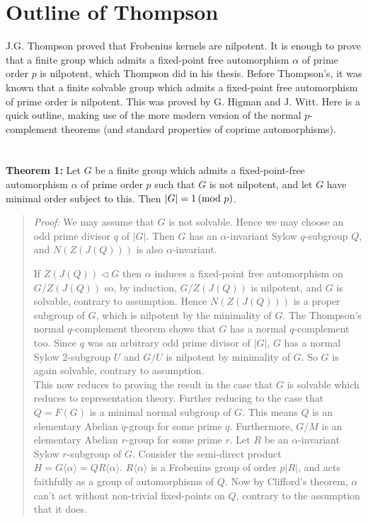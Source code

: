 \section{Outline of Thompson}
J.G. Thompson proved that Frobenius kernels are nilpotent.
It is enough to prove that a finite group which admits a fixed-point free automorphism $\alpha$
of prime order $p$ is nilpotent, which Thompson did in his thesis.
Before Thompson's, it was known that a finite solvable group which admits a fixed-point free automorphism of prime order is nilpotent. This was proved by G. Higman and J. Witt.
Here is a quick outline, making use of the more modern version of the normal $p$-complement theorems
(and standard properties of coprime automorphisms).\\
\\
\\
{\bf Theorem 1:}  Let $G$ be a finite group which admits a fixed-point-free automorphism $\alpha$ of prime order $p$ such that $G$ is not nilpotent, and let $G$  have minimal order subject to this. Then $|G|=1 \thinspace \textnormal{(mod } p \textnormal{)}$.
\begin{quote}
\emph{Proof:}
We may assume that $G$ is not solvable. Hence we may choose an odd prime divisor $q$ of $|G|$.
Then $G$ has an $\alpha$-invariant Sylow $q$-subgroup $Q$, and $N(Z(J(Q)))$
is also $\alpha$-invariant.

If $Z(J(Q)) \lhd G$ then $\alpha$ induces a fixed-point free automorphism on $G/Z(J(Q))$ so, by induction, $G/Z(J(Q))$ is nilpotent,
and $G$ is solvable, contrary to assumption.  Hence $N(Z(J(Q)))$
is a proper subgroup of $G$, which is nilpotent by the minimality of $G$.
The Thompson's normal $q$-complement theorem shows that $G$ has a normal $q$-complement too.
Since $q$ was an arbitrary odd prime divisor of $|G|$, $G$ has a normal Sylow 2-subgroup $U$ and $G/U$ is nilpotent by minimality of $G$. So $G$ is again solvable, contrary to assumption.
\\
This now reduces to proving the result in the case that $G$ is solvable which
reduces to representation theory. Further reducing to the case that $Q=F(G)$ is a minimal normal subgroup of $G$. This means $Q$ is an elementary Abelian $q$-group for some prime $q$. Furthermore, $G/M$ is an elementary Abelian $r$-group for some prime $r$.
Let $R$ be an $\alpha$-invariant Sylow $r$-subgroup of $G$.
Consider the semi-direct product $H=G \langle \alpha \rangle= Q R \langle \alpha \rangle$.
$R\langle \alpha \rangle$ is a Frobenius group of order $p|R|$, and acts faithfully as a group of automorphisms of $Q$.
Now by Clifford's theorem,
$\alpha$ can't act without non-trivial fixed-points on $Q$, contrary to the assumption that it does.
\end{quote}
